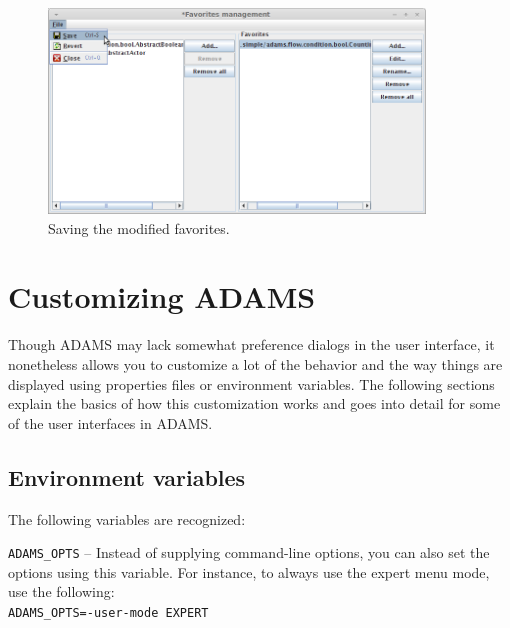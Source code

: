 \begin{figure}[htb]
  \centering
  \includegraphics[width=10.0cm]{images/favoritesmanagement-save.png}
  \caption{Saving the modified favorites.}
  \label{favoritesmanagement-save}
\end{figure}


\chapter{Customizing ADAMS}
Though ADAMS may lack somewhat preference dialogs in the user interface, it 
nonetheless allows you to customize a lot of the behavior and the way things
are displayed using properties files or environment variables. The following 
sections explain the basics of how this customization works and goes into 
detail for some of the user interfaces in ADAMS.

\section{Environment variables}
The following variables are recognized:
\begin{tight_itemize}
	\item \texttt{ADAMS\_OPTS} -- Instead of supplying command-line options, 
	you can also set the options using this variable. For instance, to always
	use the expert menu mode, use the following:\\
	\texttt{ADAMS\_OPTS=-user-mode EXPERT}
\end{tight_itemize}

